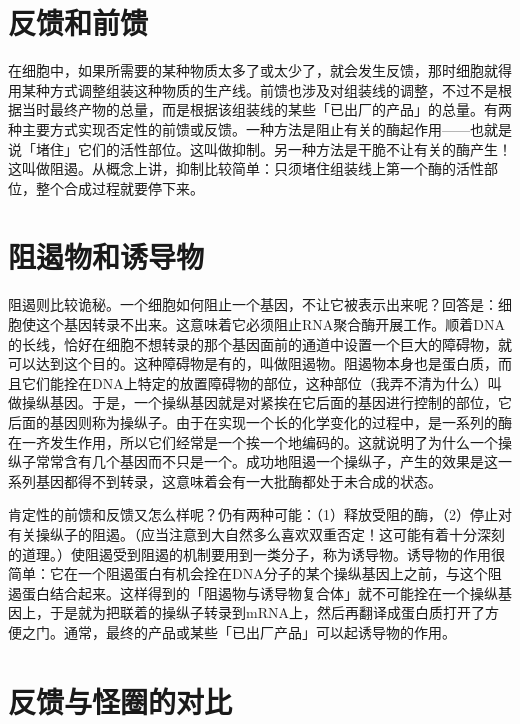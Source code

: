 \documentclass[
  12pt,
  twoside,
  openright,
  oldfontcommands,
]{memoir}
\begin{document}
\section{反馈和前馈}

在细胞中，如果所需要的某种物质太多了或太少了，就会发生反馈，那时细胞就得用某种方式调整组装这种物质的生产线。前馈也涉及对组装线的调整，不过不是根据当时最终产物的总量，而是根据该组装线的某些「已出厂的产品」的总量。有两种主要方式实现否定性的前馈或反馈。一种方法是阻止有关的酶起作用------也就是说「堵住」它们的活性部位。这叫做抑制。另一种方法是干脆不让有关的酶产生！这叫做阻遏。从概念上讲，抑制比较简单：只须堵住组装线上第一个酶的活性部位，整个合成过程就要停下来。

\section{阻遏物和诱导物}

阻遏则比较诡秘。一个细胞如何阻止一个基因，不让它被表示出来呢？回答是：细胞使这个基因转录不出来。这意味着它必须阻止RNA聚合酶开展工作。顺着DNA的长线，恰好在细胞不想转录的那个基因面前的通道中设置一个巨大的障碍物，就可以达到这个目的。这种障碍物是有的，叫做阻遏物。阻遏物本身也是蛋白质，而且它们能拴在DNA上特定的放置障碍物的部位，这种部位（我弄不清为什么）叫做操纵基因。于是，一个操纵基因就是对紧挨在它后面的基因进行控制的部位，它后面的基因则称为操纵子。由于在实现一个长的化学变化的过程中，是一系列的酶在一齐发生作用，所以它们经常是一个挨一个地编码的。这就说明了为什么一个操纵子常常含有几个基因而不只是一个。成功地阻遏一个操纵子，产生的效果是这一系列基因都得不到转录，这意味着会有一大批酶都处于未合成的状态。

肯定性的前馈和反馈又怎么样呢？仍有两种可能：（1）释放受阻的酶，（2）停止对有关操纵子的阻遏。（应当注意到大自然多么喜欢双重否定！这可能有着十分深刻的道理。）使阻遏受到阻遏的机制要用到一类分子，称为诱导物。诱导物的作用很简单：它在一个阻遏蛋白有机会拴在DNA分子的某个操纵基因上之前，与这个阻遏蛋白结合起来。这样得到的「阻遏物与诱导物复合体」就不可能拴在一个操纵基因上，于是就为把联着的操纵子转录到mRNA上，然后再翻译成蛋白质打开了方便之门。通常，最终的产品或某些「已出厂产品」可以起诱导物的作用。

\section{反馈与怪圈的对比}
\end{document}
